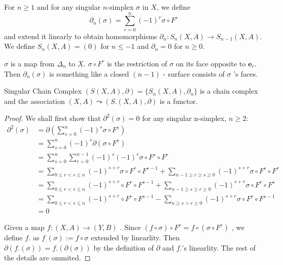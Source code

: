\documentclass[../main.tex]{subfiles}
\begin{document}
\begin{definition}{}{}
For $n \geq 1$ and for any singular $n$-simplex $\sigma$ in $X$, we define
\[
\partial_n(\sigma) = \sum_{r=0}^{n}(-1)^r \sigma \circ F^r
\]
and extend it linearly to obtain homomorphisms $\partial_n : S_n(X, A) \to S_{n-1}(X, A)$. We define $S_n(X, A) = (0)$ for $n \leq -1$ and $\partial_n = 0$ for $n \geq 0$.
\end{definition}
\begin{note}
    \(   \sigma   \) is a map from \(   \Delta _{n}  \) to \(  X  \).  \(   \sigma \circ F^{r}  \) is the restriction of \(   \sigma   \) on its face opposite to \(  \mathbf{e}_{r}  \). Then \(   \partial _{n}\left(  \sigma  \right)   \) is something like a closed \(  \left( n-1 \right)   \) - surface consists of  \(   \sigma   \) 's faces.  
\end{note}
\begin{proposition}{Singular Chain Complex}{}
$(S(X, A), \partial) = \{S_n(X, A), \partial_n\}$ is a chain complex and the association $(X, A) \leadsto (S.(X, A), \partial)$ is a functor.
\end{proposition}
\begin{proof}
    We shall first show that \(   \partial ^{2}\left(  \sigma  \right)= 0   \) for any singular n-simplex, \(  n\ge 2  \): \[
     \begin{aligned}
     \partial ^{2}\left(  \sigma  \right)&=  \partial \left( \sum _{s= 0}^{n}\left( -1 \right)^{s} \sigma \circ F^{s}  \right) \\ 
      &= \sum _{s= 0}^{n} \left( -1 \right)^{s} \partial \left(  \sigma \circ F^{s} \right)  \\ 
       &= \sum _{s= 0}^{n}\sum _{r= 0}^{n-1}\left( -1 \right)^{s}\left( -1 \right)^{r} \sigma \circ F^{s}\circ F^{r} \\ 
        &= \sum _{0\le r< s\le n}\left( -1 \right)^{s+ r} \sigma \circ F^{r}\circ F^{s-1}+ \sum _{n-1\ge r\ge s\ge 0}\left( -1 \right)^{s+ r} \sigma \circ F^{s}\circ F^{r}\\ 
         &= \sum _{0\le r< s\le n}\left( -1 \right)^{s+ r}\circ F^{r}\circ F^{s-1}+ \sum _{n-1\ge s\ge r\ge 0}\left( -1 \right)^{s+ r} \sigma \circ F^{r}\circ F^{s}    \\ 
          &= \sum _{0\le r< s\le n}\left( -1 \right)^{s+ r}\circ F^{r}\circ F^{s-1}-\sum _{n\ge s>  r\ge 0}  \left( -1 \right)^{s+ r} \sigma \circ F^{r}\circ F^{s-1}\\ 
           &= 0 
     \end{aligned} 
    \]  

    Given a map \(  f: \left( X,A \right)\to \left( Y,B \right)   \) . Since \(  \left( f\circ  \sigma  \right)\circ F^{r}= f\circ \left(  \sigma \circ F^{r} \right)    \) , we define \(  f.  \) as \(  f_{.}\left(  \sigma  \right):= f\circ  \sigma    \) extended by linearlity.  Then  \(   \partial \left( f.\left(  \sigma  \right)  \right)= f.\left(  \partial \left(  \sigma  \right)  \right)    \)  by the definition of \(    \partial   \) and \(  f.  \)'s linearlity.   The rest of the details are ommited.
\end{proof}
\end{document}
